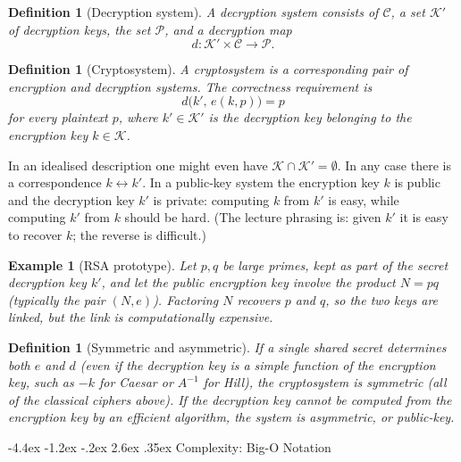 \documentclass[11pt]{article}
\makeatletter
\renewcommand{\section}{\@startsection{section}{1}{\z@}%
    {-4.4ex \@plus -1.2ex \@minus -.2ex}%
    {2.6ex \@plus .35ex}%
    {\normalfont\Large\bfseries}}
\newtheorem{definition}[theorem]{Definition}
\newtheorem{example}[theorem]{Example}
\theoremstyle{remark}
\makeatother
\begin{document}
\begin{definition}[Decryption system]
A decryption system consists of $\mathcal C$, a set $\mathcal K'$ of
decryption keys, the set $\mathcal P$, and a decryption map
\[
    d\colon \mathcal K'\times\mathcal C \longrightarrow \mathcal P.
\]
\end{definition}

\begin{definition}[Cryptosystem]
A cryptosystem is a corresponding pair of encryption and decryption
systems. The correctness requirement is
\[
    d\bigl(k',\, e(k,p)\bigr) = p
\]
for every plaintext $p$, where $k'\in\mathcal K'$ is the decryption key
belonging to the encryption key $k\in\mathcal K$.
\end{definition}

In an idealised description one might even have
$\mathcal K\cap\mathcal K'=\emptyset$. In any case there is a
correspondence $k\leftrightarrow k'$. In a public-key system the
encryption key $k$ is public and the decryption key $k'$ is private:
computing $k$ from $k'$ is easy, while computing $k'$ from $k$ should be
hard. (The lecture phrasing is: given $k'$ it is easy to recover $k$;
the reverse is difficult.)

\begin{example}[RSA prototype]
Let $p,q$ be large primes, kept as part of the secret decryption key
$k'$, and let the public encryption key involve the product $N=pq$
(typically the pair $(N,e)$). Factoring $N$ recovers $p$ and $q$, so the
two keys are linked, but the link is computationally expensive.
\end{example}

\begin{definition}[Symmetric and asymmetric]
If a single shared secret determines both $e$ and $d$ (even if the
decryption key is a simple function of the encryption key, such as
$-k$ for Caesar or $A^{-1}$ for Hill), the cryptosystem is
\emph{symmetric} (all of the classical ciphers above). If the decryption
key cannot be computed from the encryption key by an efficient algorithm,
the system is \emph{asymmetric}, or public-key.
\end{definition}

\section{Complexity: Big-O Notation}
\end{document}

